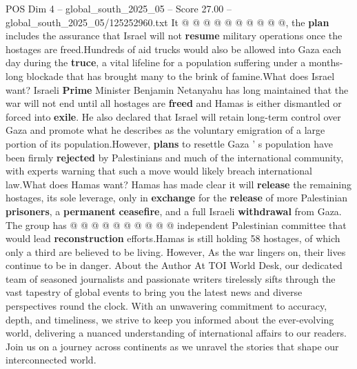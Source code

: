 \begin{textsample}{POS Dim 4 – global\_south\_2025\_05 – Score 27.00 – global\_south\_2025\_05/125252960.txt}
It @ @ @ @ @ @ @ @ @ @, the \textbf{plan} includes the assurance that Israel will not \textbf{resume} military operations once the hostages are freed.Hundreds of aid trucks would also be allowed into Gaza each day during the \textbf{truce}, a vital lifeline for a population suffering under a months-long blockade that has brought many to the brink of famine.What does Israel want?
Israeli \textbf{Prime} Minister Benjamin Netanyahu has long maintained that the war will not end until all hostages are \textbf{freed} and Hamas is either dismantled or forced into \textbf{exile}.
He also declared that Israel will retain long-term control over Gaza and promote what he describes as the voluntary emigration of a large portion of its population.However, \textbf{plans} to resettle Gaza ' s population have been firmly \textbf{rejected} by Palestinians and much of the international community, with experts warning that such a move would likely breach international law.What does Hamas want?
Hamas has made clear it will \textbf{release} the remaining hostages, its sole leverage, only in \textbf{exchange} for the \textbf{release} of more Palestinian \textbf{prisoners}, a \textbf{permanent} \textbf{ceasefire}, and a full Israeli \textbf{withdrawal} from Gaza.
The group has @ @ @ @ @ @ @ @ @ @ independent Palestinian committee that would lead \textbf{reconstruction} efforts.Hamas is still holding 58 hostages, of which only a third are believed to be living.
However, As the war lingers on, their lives continue to be in danger.
About the Author At TOI World Desk, our dedicated team of seasoned journalists and passionate writers tirelessly sifts through the vast tapestry of global events to bring you the latest news and diverse perspectives round the clock.
With an unwavering commitment to accuracy, depth, and timeliness, we strive to keep you informed about the ever-evolving world, delivering a nuanced understanding of international affairs to our readers.
Join us on a journey across continents as we unravel the stories that shape our interconnected world.

\end{textsample}

